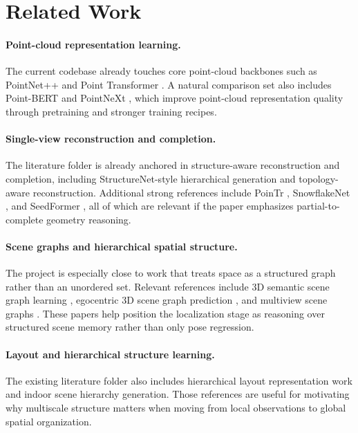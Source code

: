 \section{Related Work}

\paragraph{Point-cloud representation learning.}
The current codebase already touches core point-cloud backbones such as PointNet++ \citep{qi2017pointnetpp} and Point Transformer \citep{zhao2021pointtransformer}. A natural comparison set also includes Point-BERT \citep{yu2022pointbert} and PointNeXt \citep{qian2022pointnext}, which improve point-cloud representation quality through pretraining and stronger training recipes.

\paragraph{Single-view reconstruction and completion.}
The literature folder is already anchored in structure-aware reconstruction and completion, including StructureNet-style hierarchical generation and topology-aware reconstruction. Additional strong references include PoinTr \citep{yu2021pointr}, SnowflakeNet \citep{xiang2021snowflake}, and SeedFormer \citep{zhou2022seedformer}, all of which are relevant if the paper emphasizes partial-to-complete geometry reasoning.

\paragraph{Scene graphs and hierarchical spatial structure.}
The project is especially close to work that treats space as a structured graph rather than an unordered set. Relevant references include 3D semantic scene graph learning \citep{wald2022learning}, egocentric 3D scene graph prediction \citep{zhang2024egosg}, and multiview scene graphs \citep{zhang2024multiview}. These papers help position the localization stage as reasoning over structured scene memory rather than only pose regression.

\paragraph{Layout and hierarchical structure learning.}
The existing literature folder also includes hierarchical layout representation work \citep{bai2023layout} and indoor scene hierarchy generation. Those references are useful for motivating why multiscale structure matters when moving from local observations to global spatial organization.
